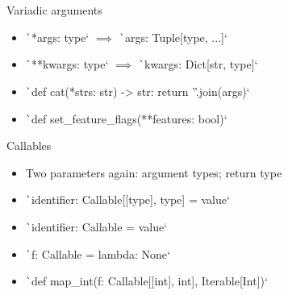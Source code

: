 \documentclass[10pt]{beamer}
\begin{document}
\begin{frame}{Variadic arguments}
    \begin{itemize}[<+->]
        \item \texttt`*args: type` $\implies$ \texttt`args: Tuple[type, ...]`
        \item \texttt`**kwargs: type` $\implies$ \texttt`kwargs: Dict[str, type]`
    \end{itemize}
    
    \pause\begin{examples}
    \begin{itemize}[<+->]
        \item \texttt`def cat(*strs: str) -> str: return ''.join(args)`
        \item \texttt`def set_feature_flags(**features: bool)`
    \end{itemize}
    \end{examples}
\end{frame}

\begin{frame}{Callables}
    \begin{itemize}[<+->]
        \item Two parameters again: argument types; return type
        \item \texttt`identifier: Callable[[type], type] = value`
        \item \texttt`identifier: Callable = value`
    \end{itemize}
    
    \pause\begin{examples}
    \begin{itemize}[<+->]
        \item \texttt`f: Callable = lambda: None`
        \item \texttt`def map_int(f: Callable[[int], int], Iterable[Int])`
    \end{itemize}
    \end{examples}
\end{frame}
\end{document}
